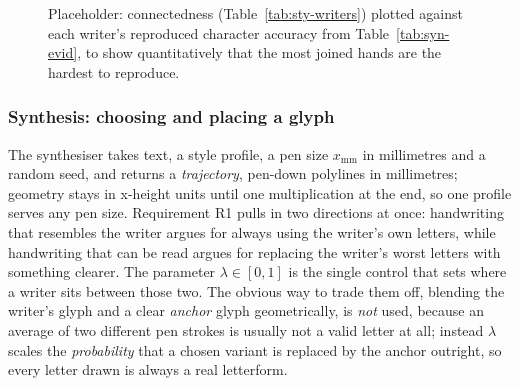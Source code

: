 \begin{figure}[htb]
\centering
{}
\captionsetup{singlelinecheck=false,justification=justified}
\caption{Placeholder: connectedness (Table~\ref{tab:sty-writers}) plotted against each writer's reproduced character accuracy from Table~\ref{tab:syn-evid}, to show quantitatively that the most joined hands are the hardest to reproduce.}
\label{fig:sty-conn-fig}
\end{figure}


\subsubsection{Synthesis: choosing and placing a glyph}
\label{sec:syn-glyph}
\label{sec:syn-place}

The synthesiser takes text, a style profile, a pen size $x_{\mathrm{mm}}$ in millimetres and a random seed, and returns a \emph{trajectory}, pen-down polylines in millimetres; geometry stays in x-height units until one multiplication at the end, so one profile serves any pen size. Requirement R1 pulls in two directions at once: handwriting that resembles the writer argues for always using the writer's own letters, while handwriting that can be read argues for replacing the writer's worst letters with something clearer. The parameter $\lambda\in[0,1]$ is the single control that sets where a writer sits between those two. The obvious way to trade them off, blending the writer's glyph and a clear \emph{anchor} glyph geometrically, is \emph{not} used, because an average of two different pen strokes is usually not a valid letter at all; instead $\lambda$ scales the \emph{probability} that a chosen variant is replaced by the anchor outright, so every letter drawn is always a real letterform.

